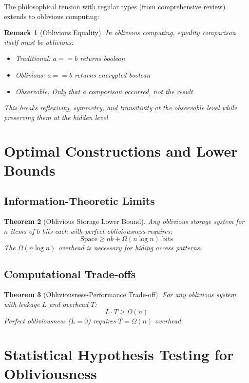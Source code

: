 \documentclass[11pt,final]{article}
\newtheorem{theorem}{Theorem}[section]
\newtheorem{remark}[theorem]{Remark}
\begin{document}
The philosophical tension with regular types (from comprehensive review) extends to oblivious computing:

\begin{remark}[Oblivious Equality]
In oblivious computing, equality comparison itself must be oblivious:
\begin{itemize}
\item Traditional: $a == b$ returns boolean
\item Oblivious: $a == b$ returns encrypted boolean
\item Observable: Only that a comparison occurred, not the result
\end{itemize}
This breaks reflexivity, symmetry, and transitivity at the observable level while preserving them at the hidden level.
\end{remark}

\section{Optimal Constructions and Lower Bounds}

\subsection{Information-Theoretic Limits}

\begin{theorem}[Oblivious Storage Lower Bound]
Any oblivious storage system for $n$ items of $b$ bits each with perfect obliviousness requires:
\begin{equation}
\text{Space} \geq nb + \Omega(n \log n) \text{ bits}
\end{equation}
The $\Omega(n \log n)$ overhead is necessary for hiding access patterns.
\end{theorem}

\subsection{Computational Trade-offs}

\begin{theorem}[Obliviousness-Performance Trade-off]
For any oblivious system with leakage $L$ and overhead $T$:
\begin{equation}
L \cdot T \geq \Omega(n)
\end{equation}
Perfect obliviousness ($L = 0$) requires $T = \Omega(n)$ overhead.
\end{theorem}

\section{Statistical Hypothesis Testing for Obliviousness}
\end{document}
